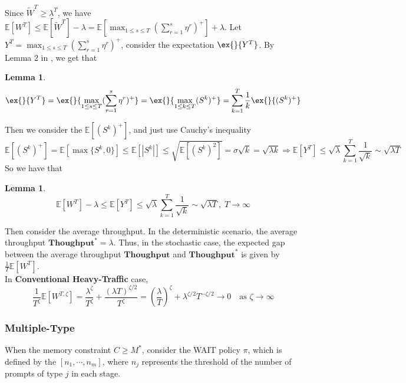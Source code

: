 \documentclass[preprint]{article}
\newcommand{\throughput}{\textbf{Thoughput}}
\theoremstyle{plain}
\newtheorem{lemma}[theorem]{Lemma}
\theoremstyle{definition}
\theoremstyle{remark}
\begin{document}
Since $\tilde{W}^T \geq \lambda^T$, we have $\mathbb{E}[W^T]\leq \mathbb{E}[\tilde{W}^T]-\lambda = \mathbb{E}[\max_{1\leq s\leq T}(\sum_{r=1}^{s}\eta^r)^+]+\lambda$. Let $Y^T = \max_{1\leq s\leq T}(\sum_{r=1}^{s}\eta^r)^+$, consider the expectation $\ex{}{Y^T}$.
By Lemma 2 in \cite{strait1974maximum}, we get that
\begin{lemma}\label{lem:Y_T}
    $$\ex{}{Y^T}=\ex{}{\max_{1\leq s\leq T}(\sum_{r=1}^s\eta^r)^+}=\ex{}{\max_{1\leq k\leq T}(S^k)^+}=\sum_{k=1}^T \frac{1}{k}\ex{}{(S^k)^+}$$
\end{lemma}
Then we consider the $\mathbb{E}[(S^k)^+]$, and just use Cauchy's inequality
$$\mathbb{E}[(S^k)^+] = \mathbb{E}[\max\{S^k, 0\}]
    \leq \mathbb{E}[|S^k|] \leq \sqrt{\mathbb{E}[(S^k)^2]}= \sigma\sqrt{k} = \sqrt{\lambda k}
    \Rightarrow \mathbb{E}[Y^T] \leq \sqrt{\lambda} \sum_{k=1}^T \frac{1}{\sqrt{k}} \sim \sqrt{\lambda T}
$$
So we have that 
\begin{lemma}\label{lemma::throughput gap}
    $$\mathbb{E}[W^T]-\lambda\leq \mathbb{E}[Y^T]\leq  \sqrt{\lambda} \sum_{k=1}^T \frac{1}{\sqrt{k}} \sim\sqrt{\lambda T},\; T\to \infty$$
\end{lemma}
Then consider the average throughput. In the deterministic scenario, the average throughput $\throughput^* = \lambda$. Thus, in the stochastic case, the expected gap between the average throughput $\throughput$ and $\throughput^*$ is given by $\frac{1}{T}\mathbb{E}[W^T]$.\\
In \textbf{Conventional Heavy-Traffic} case, 
$$\frac{1}{T^{\zeta}}\mathbb{E}[W^{T,\zeta}]= \frac{\lambda^{\zeta}}{T^{\zeta}} + \frac{(\lambda T)^{\zeta/2}}{T^{\zeta}} = \left(\frac{\lambda}{T}\right)^{\!\zeta} + \lambda^{\zeta/2} T^{-\zeta/2} \to 0 \quad \text{as } \zeta \to \infty$$
\subsubsection{Multiple-Type}

When the memory constraint $C\geq M^*$, consider the WAIT policy $\pi$, which is defined by the $[n_1,\cdots,n_m]$, where $n_j$ represents the threshold of the number of prompts of type $j$ in each stage.
\end{document}

